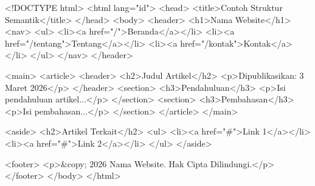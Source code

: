 \begin{webcode}[language=HTML, caption={Contoh Struktur Halaman dengan Elemen Semantik}]
<!DOCTYPE html>
<html lang="id">
<head>
  <title>Contoh Struktur Semantik</title>
</head>
<body>
  <header>
    <h1>Nama Website</h1>
    <nav>
      <ul>
        <li><a href="/">Beranda</a></li>
        <li><a href="/tentang">Tentang</a></li>
        <li><a href="/kontak">Kontak</a></li>
      </ul>
    </nav>
  </header>
  
  <main>
    <article>
      <header>
        <h2>Judul Artikel</h2>
        <p>Dipublikasikan: 3 Maret 2026</p>
      </header>
      <section>
        <h3>Pendahuluan</h3>
        <p>Isi pendahuluan artikel...</p>
      </section>
      <section>
        <h3>Pembahasan</h3>
        <p>Isi pembahasan...</p>
      </section>
    </article>
  </main>
  
  <aside>
    <h2>Artikel Terkait</h2>
    <ul>
      <li><a href="#">Link 1</a></li>
      <li><a href="#">Link 2</a></li>
    </ul>
  </aside>
  
  <footer>
    <p>&copy; 2026 Nama Website. Hak Cipta Dilindungi.</p>
  </footer>
</body>
</html>
\end{webcode}

